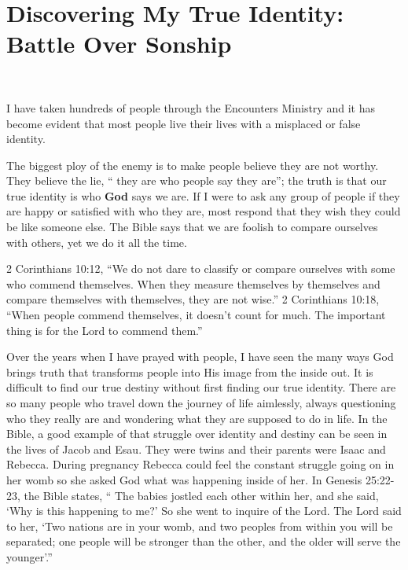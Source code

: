 \documentclass[twoside, 12pt]{book}
\begin{document}
\chapter{Discovering My True Identity: Battle Over Sonship}
\

I have taken hundreds of people through the Encounters Ministry and it has become evident that most people live their lives with a misplaced or false identity.

The biggest ploy of the enemy is to make people believe they are not worthy. They believe the lie, “ they are who people say they are”; the truth is that our true identity is who \textbf{God} says we are. If I were to ask any group of people if they are happy or satisfied with who they are, most respond that they wish they could be like someone else. The Bible says that we are foolish to compare ourselves with others, yet we do it all the time.

2 Corinthians 10:12, “We do not dare to classify or compare ourselves with some who commend themselves. When they measure themselves by themselves and compare themselves with themselves, they are not wise.” 2 Corinthians 10:18, “When people commend themselves, it doesn't count for much. The important thing is for the Lord to commend them.”

Over the years when I have prayed with people, I have seen the many ways God brings truth that transforms people into His image from the inside out. It is difficult to find our true destiny without first finding our true identity. There are so many people who travel down the journey of life aimlessly, always questioning who they really are and wondering what they are supposed to do in life. In the Bible, a good example of that struggle over identity and destiny can be seen in the lives of Jacob and Esau. They were twins and their parents were Isaac and Rebecca. During pregnancy Rebecca could feel the constant struggle going on in her womb so she asked God what was happening inside of her. In Genesis 25:22-23, the Bible states, “ The babies jostled each other within her, and she said, ‘Why is this happening to me?’ So she went to inquire of the Lord. The Lord said to her, ‘Two nations are in your womb, and two peoples from within you will be separated; one people will be stronger than the other, and the older will serve the younger’.”
\end{document}
